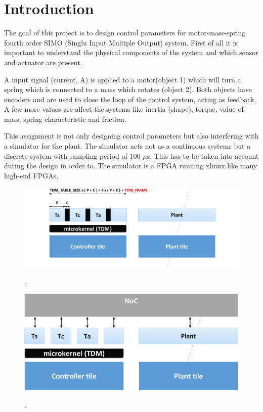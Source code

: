 \section{Introduction}
The goal of this project is to design control parameters for motor-mass-spring fourth order SIMO (Singlu Input Multiple Output) system. First of all it is important to understand the physical components of the system and which sensor and actuator are present.

A input signal (current, A) is applied to a motor(object 1) which will turn a spring which is connected to a mass which rotates (object 2). Both objects have encoders and are used to close the loop of the control system, acting as feedback. A few more values are affect the systems like inertia (shape), torque, value of mass, spring characteristic and friction.

This assignment is not only designing control parameters but also interfering with a simulator for the plant. The simulator acts not as a continuous systems but a discrete system with sampling period of 100 $\mu$s. This has to be taken into account during the design in order to. The simulator is a FPGA running xlinux like many high-end FPGAs. 

\begin{figure}[h]
	\begin{center}
		\includegraphics[width=0.7\linewidth]{img/task}
		\caption{}.
		\label{fig:task}
	\end{center}
\end{figure}



\begin{figure}[h]
	\begin{center}
		\includegraphics[width=0.7\linewidth]{img/plant}
		\caption{}.
		\label{fig:plant}
	\end{center}
\end{figure}

